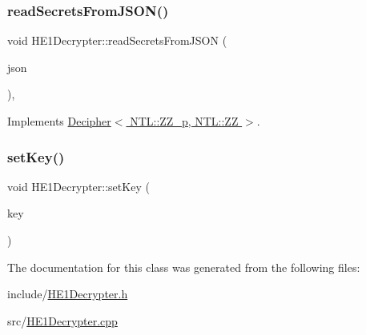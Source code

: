 \subsubsection{\texorpdfstring{read\+Secrets\+From\+J\+S\+O\+N()}{readSecretsFromJSON()}}
{\footnotesize\ttfamily void H\+E1\+Decrypter\+::read\+Secrets\+From\+J\+S\+ON (\begin{DoxyParamCaption}\item[{std\+::string \&}]{json }\end{DoxyParamCaption})\hspace{0.3cm}{\ttfamily [override]}, {\ttfamily [virtual]}}



Implements \hyperlink{classDecipher_a39aea002012130201e12a8fa7d84dda5}{Decipher$<$ N\+T\+L\+::\+Z\+Z\+\_\+p, N\+T\+L\+::\+Z\+Z $>$}.

\mbox{\label{classHE1Decrypter_a7b06b69bcd5ef096067232f819321482}} 
\subsubsection{\texorpdfstring{set\+Key()}{setKey()}}
{\footnotesize\ttfamily void H\+E1\+Decrypter\+::set\+Key (\begin{DoxyParamCaption}\item[{N\+T\+L\+::\+ZZ \&}]{key }\end{DoxyParamCaption})}



The documentation for this class was generated from the following files\+:\begin{DoxyCompactItemize}
\item 
include/\hyperlink{HE1Decrypter_8h}{H\+E1\+Decrypter.\+h}\item 
src/\hyperlink{HE1Decrypter_8cpp}{H\+E1\+Decrypter.\+cpp}\end{DoxyCompactItemize}

